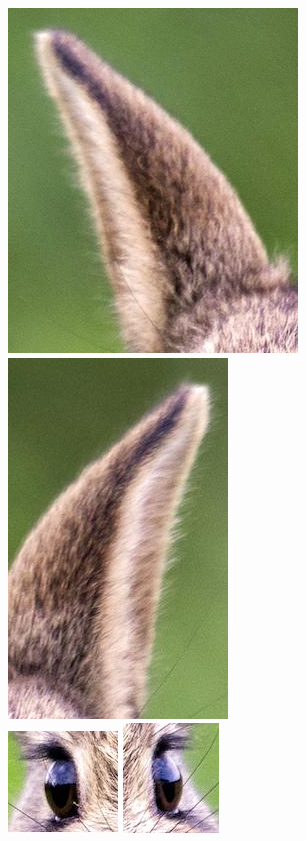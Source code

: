 \documentclass[12pt,aspectratio=169]{beamer}
\begin{document}
\begin{frame}
\begin{center}
\includegraphics[scale=0.2]{ear1}\pause
\includegraphics[scale=0.2]{ear2}\pause\\
\includegraphics[scale=0.5]{eye1}\pause
\includegraphics[scale=0.5]{eye2}\pause\\

\end{center}
\end{frame}
\end{document}
